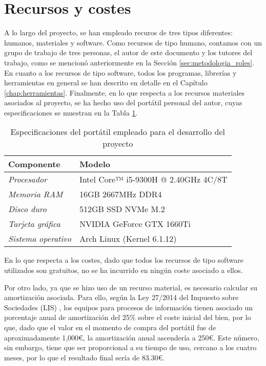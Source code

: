 \section{Recursos y costes}
\label{sec:planificacion_costes}

A lo largo del proyecto, se han empleado recuros de tres tipos diferentes: humanos, materiales y software.
Como recursos de tipo humano,
contamos con un grupo de trabajo de tres personas, el autor de este documento y los tutores del trabajo,
como se mencionó anteriormente en la Sección \ref{sec:metodologia_roles}.
En cuanto a los recursos de tipo software, todos los programas, librerías y herramientas en general
se han descrito en detalle en el Capítulo \ref{chap:herramientas}.
Finalmente, en lo que respecta a los recursos materiales asociados al proyecto, se ha hecho uso del portátil personal del autor,
cuyas especificaciones se muestran en la Tabla \ref{tab:costes_hardware}.

\bigskip
\begin{table}[H]
	\centering
	\begin{tabular}{|l|l|}
		\rowcolor{udcpink!25}
		\hline
		\small \textbf{Componente}        & \small \textbf{Modelo}                      \\ \hline
		\small \textit{Procesador}        & \small Intel Core™ i5-9300H @ 2.40GHz 4C/8T \\ \hline
		\small \textit{Memoria RAM}       & \small 16GB 2667MHz DDR4                    \\ \hline
		\small \textit{Disco duro}        & \small 512GB SSD NVMe M.2                   \\ \hline
		\small \textit{Tarjeta gráfica}   & \small NVIDIA GeForce GTX 1660Ti            \\ \hline
		\small \textit{Sistema operativo} & \small Arch Linux (Kernel 6.1.12)                    \\ \hline
	\end{tabular}
	\caption{Especificaciones del portátil empleado para el desarrollo del proyecto}
	\label{tab:costes_hardware}
\end{table}

\bigskip
En lo que respecta a los costes, dado que todos los recursos de tipo software utilizados son gratuitos, no se ha incurrido en ningún coste
asociado a ellos.

\bigskip
Por otro lado, ya que se hizo uso de un recurso material,
es necesario calcular su amortización asociada. Para ello, según la Ley 27/2014 del Impuesto sobre Sociedades (LIS) \cite{leysociedades},
los equipos para procesos de información tienen asociado un porcentaje anual de amortización del 25\% sobre el coste inicial del bien,
por lo que, dado que el valor en el momento de compra del portátil fue de aproximadamente 1,000€, la amortización anual ascendería a 250€. Este número, sin embargo,
tiene que ser proporcional a su tiempo de uso, cercano a los cuatro meses, por lo que el resultado final sería de 83.30€.

